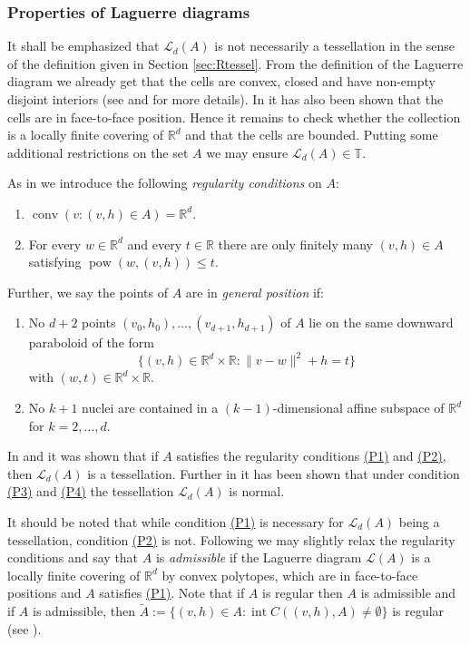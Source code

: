 \documentclass[11pt,a4paper]{article}
\theoremstyle{plain}
\theoremstyle{definition}
\theoremstyle{remark}
\def\RR{\mathbb{R}}
\def\TT{\mathbb{T}}
\def\cL{\mathcal{L}}
\newcommand{\conv}{\mathop{\mathrm{conv}}\nolimits}
\newcommand{\pow}{\mathop{\mathrm{pow}}\nolimits}
\newcommand{\inter}{\operatorname{int}}
\begin{document}
\subsubsection{Properties of Laguerre diagrams}\label{sec:LaguerreDiagramProperties}

It shall be emphasized that $\cL_d(A)$ is not necessarily a tessellation in the sense of the definition given in Section \ref{sec:Rtessel}. From the definition of the Laguerre diagram we already get that the cells are convex, closed and have non-empty disjoint interiors (see \cite[Section~2]{Sch93} and \cite[Section~2.2]{Ldoc} for more details). In \cite[Proposition 1, Step 5]{Sch93} it has also been shown that the cells are in face-to-face position. Hence it remains to check whether the collection is a locally finite covering of $\RR^d$ and that the cells are bounded. Putting some additional restrictions on the set $A$ we may ensure $\cL_d(A)\in\TT$. 

As in \cite[Definition 2.2.1]{Ldoc} we introduce the following \textit{regularity conditions} on $A$:
\begin{enumerate}
    \item[(P1)] $\conv(v\colon (v,h)\in A)=\RR^{d}$.\label{item:P1}
    \item[(P2)] For every $w\in\RR^{d}$ and every $t\in \RR$ there are only finitely many $(v,h)\in A$ satisfying $\pow (w,(v,h))\leq t$.\label{item:P2}
\end{enumerate}
Further, we say the points of $A$ are in \textit{general position} if:
\begin{enumerate} 
    \item[(P3)] No $d+2$ points $(v_0,h_0),\dots, (v_{d+1},h_{d+1})$ 
    of $A$ lie on the same downward paraboloid of the form
    \[
        \{(v,h)\in \RR^{d}\times\RR:  \|v - w\|^2 + h = t\}
    \]
    with  $(w,t)\in\RR^{d}\times \RR$.\label{item:P3}
    \item[(P4)] No $k+1$ nuclei are contained in a $(k-1)$-dimensional affine subspace of $\RR^d$ for $k=2,\ldots,d$.\label{item:P4}
\end{enumerate} 
In \cite[Proposition 2.2.4]{Ldoc} and \cite[Proposition~1]{Sch93} it was shown that if $A$ satisfies the regularity conditions \hyperref[item:P1]{(P1)} and \hyperref[item:P2]{(P2)}, then $\cL_d(A)$ is a tessellation. Further in \cite[Corollary 2.2.7]{Ldoc} it has been shown that under condition \hyperref[item:P3]{(P3)} and \hyperref[item:P4]{(P4)} the tessellation $\cL_d(A)$ is normal.

It should be noted that while condition \hyperref[item:P1]{(P1)} is necessary for $\cL_d(A)$ being a tessellation, condition \hyperref[item:P2]{(P2)} is not. Following \cite{Sch93} we may slightly relax the regularity conditions and say that $A$ is \textit{admissible} if the Laguerre diagram $\cL(A)$ is a locally finite covering of $\RR^d$ by convex polytopes, which are in face-to-face positions and $A$ satisfies \hyperref[item:P1]{(P1)}. Note that if $A$ is regular then $A$ is admissible and if $A$ is admissible, then $\tilde A:=\{(v,h)\in A\colon \inter C((v,h),A)\neq\emptyset\}$ is regular (see \cite[Proposition 2]{Sch93}).
\end{document}
